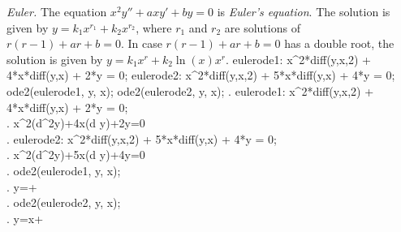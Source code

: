 \documentclass{article}
\begin{document}
\noindent
\textit{Euler.}\quad
The equation $x^2y'' + axy' + by=0$ is \textit{Euler's equation}.  
The solution is given by $y=k_1x^{r_1} + k_2x^{r_2}$, where $r_1$ and
$r_2$ are solutions of $r(r-1) + ar + b=0$.
In case $r(r-1) + ar + b=0$ has a double root,
the solution is given by $y=k_1x^{r} + k_2\ln(x)x^{r}$.
\beginmaximasession
eulerode1: x^2*diff(y,x,2) + 4*x*diff(y,x) + 2*y = 0;
eulerode2: x^2*diff(y,x,2) + 5*x*diff(y,x) + 4*y = 0;
ode2(eulerode1, y, x);
ode2(eulerode2, y, x);
\maximatexsession
{}.  eulerode1: x^2*diff(y,x,2) + 4*x*diff(y,x) + 2*y = 0; \\
.   x^{2}\*\left({{d^{2}}}\*y\right)+4\*x\*\left({{d
 }}\*y\right)+2\*y=0 \\
.  eulerode2: x^2*diff(y,x,2) + 5*x*diff(y,x) + 4*y = 0; \\
.   x^{2}\*\left({{d^{2}}}\*y\right)+5\*x\*\left({{d
 }}\*y\right)+4\*y=0 \\
.  ode2(eulerode1, y, x); \\
.   y={{}}+{{}} \\
.  ode2(eulerode2, y, x); \\
.   y={{\*\log x+}} \\
\endmaximasession

\smallskip
\end{document}

